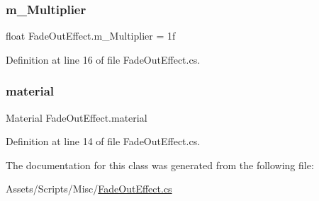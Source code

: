 \mbox{\label{class_fade_out_effect_a5e9ce8885ef21f947dad790e1756caac}} 
\subsubsection{\texorpdfstring{m\+\_\+\+Multiplier}{m\_Multiplier}}
{\footnotesize\ttfamily float Fade\+Out\+Effect.\+m\+\_\+\+Multiplier = 1f}



Definition at line 16 of file Fade\+Out\+Effect.\+cs.

\mbox{\label{class_fade_out_effect_a83a58cb79fe762c863c3eaafece22a1f}} 
\subsubsection{\texorpdfstring{material}{material}}
{\footnotesize\ttfamily Material Fade\+Out\+Effect.\+material}



Definition at line 14 of file Fade\+Out\+Effect.\+cs.



The documentation for this class was generated from the following file\+:\begin{DoxyCompactItemize}
\item 
Assets/\+Scripts/\+Misc/\mbox{\hyperlink{_fade_out_effect_8cs}{Fade\+Out\+Effect.\+cs}}\end{DoxyCompactItemize}
